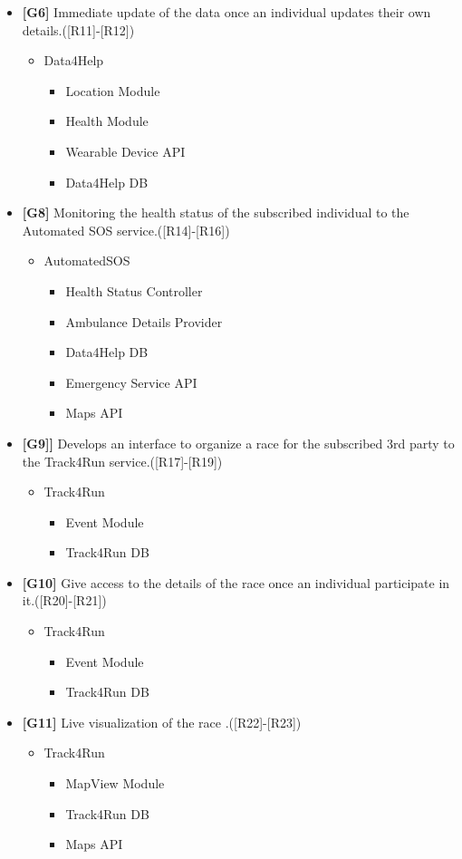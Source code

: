 \begin{itemize}
\item\textbf{[G6]} Immediate update of the data once an individual updates their own details.([R11]-[R12])
\begin{itemize}
\item Data4Help
\begin{itemize}
\item Location Module
\item Health Module
\item Wearable Device API
\item Data4Help DB
\end{itemize}
\end{itemize}

\item\textbf{[G8]} Monitoring the health status of the subscribed individual to the Automated SOS service.([R14]-[R16])
\begin{itemize}
\item AutomatedSOS
\begin{itemize}
\item Health Status Controller
\item Ambulance Details Provider
\item Data4Help DB
\item Emergency Service API
\item Maps API
\end{itemize}
\end{itemize}

\item\textbf{[G9]]}  Develops an interface to organize a race for the subscribed 3rd party to the Track4Run service.([R17]-[R19])
\begin{itemize}
\item Track4Run
\begin{itemize}
\item Event Module
\item Track4Run DB
\end{itemize}
\end{itemize}

\item\textbf{[G10]} Give access to the details of the race once an individual participate in it.([R20]-[R21])
\begin{itemize}
\item Track4Run
\begin{itemize}
\item Event Module
\item Track4Run DB
\end{itemize}
\end{itemize}

\item\textbf{[G11]} Live visualization of the race .([R22]-[R23])
\begin{itemize}
\item Track4Run
\begin{itemize}
\item MapView Module
\item Track4Run DB
\item Maps API
\end{itemize}
\end{itemize}

\end{itemize}